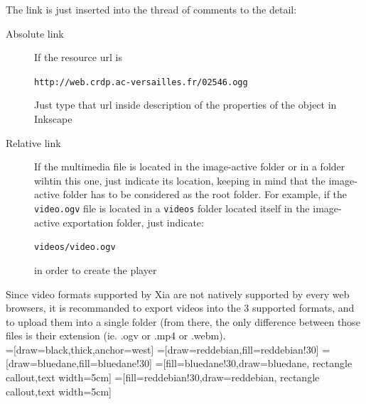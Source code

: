 The link is just inserted into the thread of comments to the detail:
\begin{description}
 \item[Absolute link] If the resource url is
 
 \verb|http://web.crdp.ac-versailles.fr/02546.ogg|
 
 Just type that url inside description of the properties of the object in 
 Inkscape  \item [Relative link] If the multimedia file is located in the image-active 
 folder or in a folder wihtin this one, just indicate its location, keeping in 
 mind that the image-active folder has to be considered as the root folder. 
 For example, if the \verb|video.ogv| file is located in a \verb|videos| 
 folder located itself in the image-active exportation folder, just indicate:
 
  \verb|videos/video.ogv|
 
  in order to create the player
\end{description}

Since video formats supported by Xia are not natively supported by every web 
browsers, it is recommanded to export videos into the 3 supported formats, 
and to upload them into a single folder (from there, the only difference 
between those files is their extension (ie. .ogv or .mp4 or .webm).\\

=[draw=black,thick,anchor=west]
=[draw=reddebian,fill=reddebian!30]
=[draw=bluedane,fill=bluedane!30]
=[fill=bluedane!30,draw=bluedane, rectangle callout,text width=5cm]
=[fill=reddebian!30,draw=reddebian, rectangle callout,text width=5cm]


